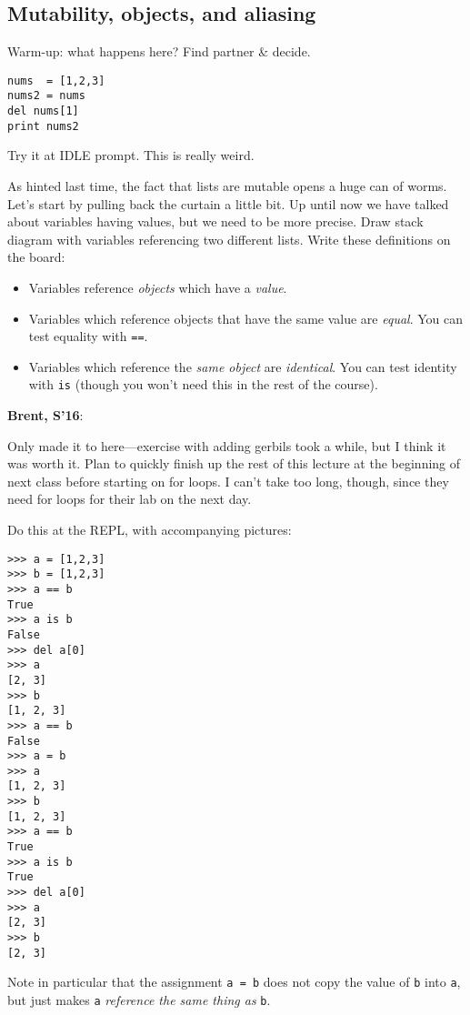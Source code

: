 \documentclass{article}
\newenvironment{reflect}[1]
{
  \noindent
  \begin{lrbox}{\reflectbox}
    \begin{minipage}[t]{\textwidth}
      \textbf{#1}:
}{
    \end{minipage}
  \end{lrbox}
  \fbox{\usebox{\reflectbox}}
}
\begin{document}
\subsection*{Mutability, objects, and aliasing}

Warm-up: what happens here?  Find partner \& decide.
\begin{verbatim}
nums  = [1,2,3]
nums2 = nums
del nums[1]
print nums2
\end{verbatim}

Try it at IDLE prompt.  This is really weird.

As hinted last time, the fact that lists are mutable opens a huge can
of worms.  Let's start by pulling back the curtain a little bit.  Up
until now we have talked about variables having values, but we need to
be more precise.  Draw stack diagram with variables referencing two
different lists.  Write these definitions on the board:

\begin{itemize}
\item Variables reference \emph{objects} which have a \emph{value}.
\item Variables which reference objects that have the same value are
  \emph{equal}.  You can test equality with \verb|==|.
\item Variables which reference the \emph{same object} are
  \emph{identical}. You can test identity with \verb|is| (though you
  won't need this in the rest of the course).
\end{itemize}

\begin{reflect}{Brent, S'16}
  Only made it to here---exercise with adding gerbils took a while,
  but I think it was worth it.  Plan to quickly finish up the rest of
  this lecture at the beginning of next class before starting on for
  loops.  I can't take too long, though, since they need for loops for
  their lab on the next day.
\end{reflect}

Do this at the REPL, with accompanying pictures:
\begin{verbatim}
>>> a = [1,2,3]
>>> b = [1,2,3]
>>> a == b
True
>>> a is b
False
>>> del a[0]
>>> a
[2, 3]
>>> b
[1, 2, 3]
>>> a == b
False
>>> a = b
>>> a
[1, 2, 3]
>>> b
[1, 2, 3]
>>> a == b
True
>>> a is b
True
>>> del a[0]
>>> a
[2, 3]
>>> b
[2, 3]
\end{verbatim}
Note in particular that the assignment \verb|a = b| does not copy the
value of \verb|b| into \verb|a|, but just makes \verb|a|
\emph{reference the same thing as} \verb|b|.
\end{document}
